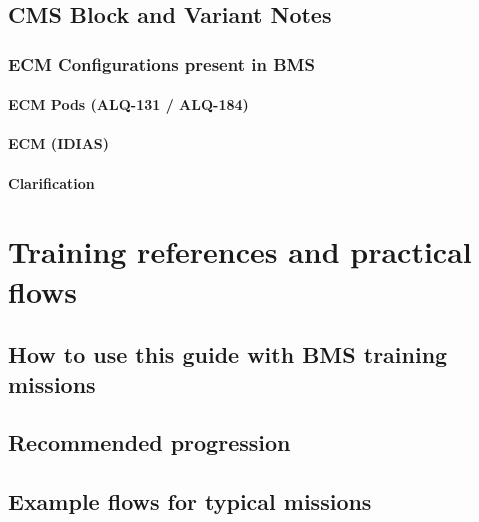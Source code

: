 \documentclass[11pt, a4paper, twoside]{report}
\begin{document}
\section{CMS Block and Variant Notes}

\subsection{ECM Configurations present in BMS}

\subsubsection{ECM Pods (ALQ-131 / ALQ-184)}

\subsubsection{ECM (IDIAS)}

\subsubsection{Clarification}

\newpage
\chapter{Training references and practical flows}

\section{How to use this guide with BMS training missions}

\section{Recommended progression}

\section{Example flows for typical missions}
\end{document}
